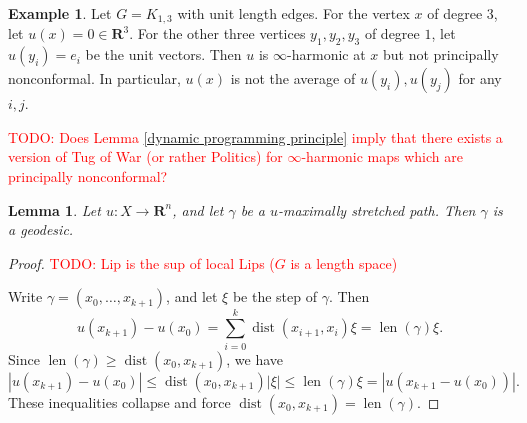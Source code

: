 \documentclass[reqno,11pt]{amsart}
\newcommand{\RR}{\mathbf{R}}
\DeclareMathOperator{\dist}{dist}
\DeclareMathOperator{\len}{len}
\newtheorem{lemma}[theorem]{Lemma}
\theoremstyle{definition}
\newtheorem{example}[theorem]{Example}
\numberwithin{equation}{section}
\newcommand\todo[1]{\textcolor{red}{TODO: #1}}
\begin{document}
\begin{example}
Let $G = K_{1, 3}$ with unit length edges.
For the vertex $x$ of degree $3$, let $u(x) = 0 \in \RR^3$.
For the other three vertices $y_1, y_2, y_3$ of degree $1$, let $u(y_i) = e_i$ be the unit vectors.
Then $u$ is $\infty$-harmonic at $x$ but not principally nonconformal.
In particular, $u(x)$ is not the average of $u(y_i), u(y_j)$ for any $i, j$.
\end{example}

\todo{Does Lemma \ref{dynamic programming principle} imply that there exists a version of Tug of War (or rather Politics) for $\infty$-harmonic maps which are principally nonconformal?}

\begin{lemma}
Let $u: X \to \RR^n$, and let $\gamma$ be a $u$-maximally stretched path.
Then $\gamma$ is a geodesic.
\end{lemma}
\begin{proof}
\todo{Lip is the sup of local Lips ($G$ is a length space)}

Write $\gamma = (x_0, \dots, x_{k + 1})$, and let $\xi$ be the step of $\gamma$.
Then
$$u(x_{k + 1}) - u(x_0) = \sum_{i=0}^k \dist(x_{i + 1}, x_i) \xi = \len(\gamma) \xi.$$
Since $\len(\gamma) \geq \dist(x_0, x_{k + 1})$, we have 
$$|u(x_{k + 1}) - u(x_0)| \leq \dist(x_0, x_{k + 1}) |\xi| \leq \len(\gamma) \xi = |u(x_{k + 1} - u(x_0))|.$$
These inequalities collapse and force $\dist(x_0, x_{k + 1}) = \len(\gamma)$.
\end{proof}
\end{document}
